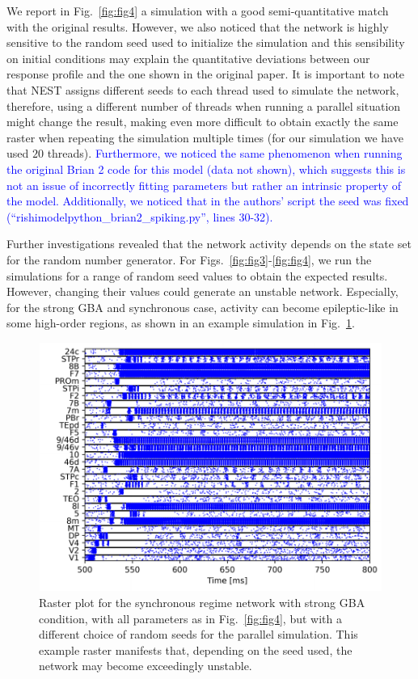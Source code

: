 We report in Fig.~\ref{fig:fig4} a simulation with a good semi-quantitative match with the original results. However, we also noticed that the network is highly sensitive to the random seed used to initialize the simulation and this sensibility on initial conditions may explain the quantitative deviations between our response profile and the one shown in the original paper. It is important to note that NEST assigns different seeds to each thread used to simulate the network, therefore, using a different number of threads when running a parallel situation might change the result, making even more difficult to obtain exactly the same raster when repeating the simulation multiple times (for our simulation we have used $20$ threads). \textcolor{blue}{Furthermore, we noticed the same phenomenon  when running the original Brian 2 code for this model (data not shown), which suggests this is not an issue of incorrectly fitting parameters but rather an intrinsic property of the model. Additionally, we noticed that in the authors' script the seed was fixed (``rishimodelpython\_brian2\_spiking.py'', lines 30-32).}



Further investigations revealed that the network activity depends on the state set for the random number generator. For Figs.~\ref{fig:fig3}-\ref{fig:fig4}, we run the simulations for a range of random seed values to obtain the expected results. However, changing their values could generate an unstable network. Especially, for the strong GBA and synchronous case, activity can become epileptic-like in some high-order regions, as shown in an example simulation in Fig.~\ref{fig:fig5}. 

\begin{figure}[!ht]
 \centering
     \includegraphics[scale=0.6]{figures/fig7.pdf}
 \caption{Raster plot for the synchronous regime network with strong GBA condition, with all parameters as in Fig.~\ref{fig:fig4}, but with a different choice of random seeds for the parallel simulation. This example raster manifests that, depending on the seed used, the network may become exceedingly unstable.}\label{fig:fig5}
\end{figure}

